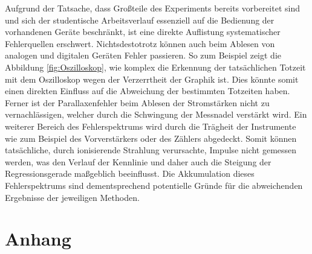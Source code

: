 \noindent Aufgrund der Tatsache, dass Großteile des Experiments bereits vorbereitet sind und sich der studentische Arbeitsverlauf 
essenziell auf die Bedienung der vorhandenen Geräte beschränkt, ist eine direkte Auflistung systematischer Fehlerquellen 
erschwert. Nichtsdestotrotz können auch beim Ablesen von analogen und digitalen Geräten Fehler passieren. So zum Beispiel 
zeigt die Abbildung \ref{fig:Oszilloskop}, wie komplex die Erkennung der tatsächlichen Totzeit mit dem Oszilloskop wegen der 
Verzerrtheit der Graphik ist. Dies könnte somit einen direkten Einfluss auf die Abweichung der bestimmten Totzeiten haben.
Ferner ist der Parallaxenfehler beim Ablesen der Stromstärken nicht zu vernachlässigen, welcher durch die Schwingung der Messnadel
verstärkt wird. Ein weiterer Bereich des Fehlerspektrums wird durch die Trägheit der Instrumente wie zum Beispiel des Vorverstärkers 
oder des Zählers abgedeckt. Somit können tatsächliche, durch ionisierende Strahlung verursachte, Impulse nicht gemessen werden, 
was den Verlauf der Kennlinie und daher auch die Steigung der Regressionsgerade maßgeblich beeinflusst. Die Akkumulation dieses 
Fehlerspektrums sind dementsprechend potentielle Gründe für die abweichenden Ergebnisse der jeweiligen Methoden.   
 
\section{Anhang}

